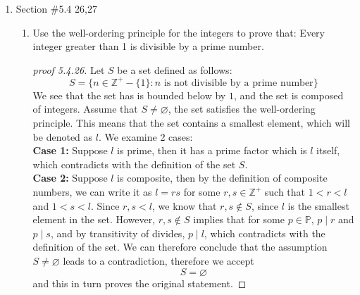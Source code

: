 \documentclass[12pt]{article}
\newcommand{\Z}{\mathbb{Z}}
\begin{document}
\begin{enumerate}
        \newpage

    \item Section \#5.4 26,27
        \begin{enumerate}
            \item[26.] Use the well-ordering principle for the integers to prove that: Every integer greater than 1 is divisible by a prime number.
            \begin{proof}[proof 5.4.26]
                Let $S$ be a set defined as follows:
                \[
                S = \{ n \in \Z^+ - \{1\} : \text{$n$ is not divisible by a prime number}\}
                \]
                We see that the set has is bounded below by $1$, and the set is composed of integers. Assume that $S \neq \varnothing$, the set satisfies the well-ordering principle. This means that the set contains a smallest element, which will be denoted as $l$. We examine 2 cases:\\
                \textbf{Case 1:} Suppose $l$ is prime, then it has a prime factor which is $l$ itself, which contradicts with the definition of the set $S.$\\
                \textbf{Case 2:} Suppose $l$ is composite, then by the definition of composite numbers, we can write it as $l = rs$ for some $r,s \in \Z^+$ such that $1 < r < l$ and $1 < s < l$. Since $r,s < l$, we know that $r,s \notin S$, since $l$ is the smallest element in the set. However, $r,s \notin S$ implies that for some $p \in \mathbb{P}$, $p \mid r$ and $p \mid s$, and by transitivity of divides, $p \mid l$, which contradicts with the definition of the set. We can therefore conclude that the assumption $S \neq \varnothing$ leads to a contradiction, therefore we accept 
                \[
                S = \varnothing
                \]
                and this in turn proves the original statement. 
            \end{proof}


\end{enumerate}
\end{enumerate}
\end{document}
